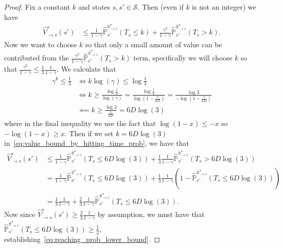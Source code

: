 \documentclass{article}
\theoremstyle{plain}
\theoremstyle{plain}
\theoremstyle{remark}
\theoremstyle{plain}
\theoremstyle{plain}
\renewcommand{\P}{\mathbb{P}}
\newcommand{\Vhat}{\widehat{V}}
\newcommand{\pihstar}{\widehat{\pi}^\star}
\renewcommand{\S}{\mathcal{S}}
\begin{document}
\begin{proof}
        Fix a constant $k$ and states $s,s' \in \S$. Then (even if $k$ is not an integer) we have
        \begin{align}
            \Vhat^\star_{\to s}(s') & \leq \frac{1}{1-\gamma} \widehat{\P}_{s'}^{\pihstar_{\to s}}\left(T_{s} \leq k\right) + \frac{\gamma^k}{1-\gamma} \widehat{\P}_{s'}^{\pihstar_{\to s}}\left(T_{s} > k\right). \label{eq:value_bound_by_hitting_time_prob}
        \end{align}
        Now we want to choose $k$ so that only a small amount of value can be contributed from the $\frac{\gamma^k}{1-\gamma} \widehat{\P}_{s'}^{\pihstar_{\to s}}\left(T_{s} > k\right)$ term, specifically we will choose $k$ so that $\frac{\gamma^k}{1-\gamma} \leq \frac{1}{3}\frac{1}{1-\gamma}$. We calculate that
        \begin{align*}
            \gamma^k \leq \frac{1}{3} & \iff k \log(\gamma) \leq \log \frac{1}{3} \\
            & \iff k \geq \frac{\log \frac{1}{3}}{\log(\gamma)} = \frac{\log \frac{1}{3}}{\log \left( 1 - \frac{1}{6D}\right)}  = \frac{\log 3}{- \log \left( 1 - \frac{1}{6D}\right)}\\
            & \impliedby k \geq \frac{\log 3}{ \frac{1}{6D}} = 6 D \log( 3) 
        \end{align*}
        where in the final inequality we use the fact that $\log (1-x) \leq -x$ so $-\log (1-x) \geq x$. Then if we set $k = 6 D \log(3)$ in~\eqref{eq:value_bound_by_hitting_time_prob}, we have that 
        \begin{align*}
            \Vhat^\star_{\to s}(s') & \leq \frac{1}{1-\gamma} \widehat{\P}_{s'}^{\pihstar_{\to s}}\left(T_{s} \leq 6 D \log( 3)\right) + \frac{1}{3}\frac{1}{1-\gamma} \widehat{\P}_{s'}^{\pihstar_{\to s}}\left(T_{s} > 6 D \log( 3)\right) \\
            & =\frac{1}{1-\gamma} \widehat{\P}_{s'}^{\pihstar_{\to s}}\left(T_{s} \leq 6 D \log( 3)\right) + \frac{1}{3}\frac{1}{1-\gamma} \left(1 - \widehat{\P}_{s'}^{\pihstar_{\to s}}\left(T_{s} \leq 6 D \log( 3)\right) \right) \\
            &= \frac{1}{3}\frac{1}{1-\gamma} + \frac{2}{3}\frac{1}{1-\gamma} \widehat{\P}_{s'}^{\pihstar_{\to s}}\left(T_{s} \leq 6 D \log( 3)\right).
        \end{align*}
        Now since $\Vhat^\star_{\to s}(s') \geq \frac{2}{3} \frac{1}{1-\gamma}$ by assumption, we must have that $\widehat{\P}_{s'}^{\pihstar_{\to s}}\left(T_{s} \leq 6 D \log( 3)\right) \geq \frac{1}{2}$, establishing~\eqref{eq:reaching_prob_lower_bound}. 


\end{proof}
\end{document}
